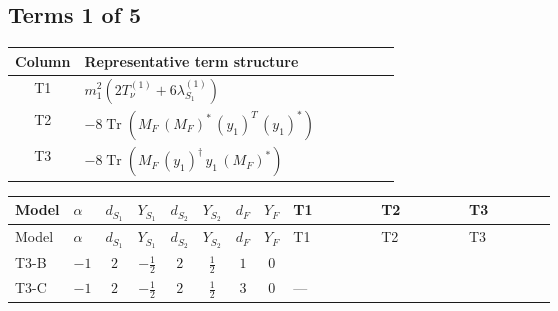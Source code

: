 \documentclass[8pt]{article}
\begin{document}
\begin{landscape}
\subsection*{Terms 1 of 5}
\begin{center}
\begin{tabular}{@{}c >{\raggedright\arraybackslash}p{0.82\linewidth}@{}}
\toprule
Column & Representative term structure \\
\midrule
T1 & \(\displaystyle {m_1^2} (2 T_{\nu}^{(1)}+6 {\lambda_{S_1}^{(1)}})\) \\
\midrule
T2 & \(\displaystyle -8 \operatorname{Tr}\!\left({M_F}\,\left({M_F}\right)^{*}\,\left({y_1}\right)^{T}\,\left({y_1}\right)^{*}\right)\) \\
\midrule
T3 & \(\displaystyle -8 \operatorname{Tr}\!\left({M_F}\,\left({y_1}\right)^{\dagger}\,{y_1}\,\left({M_F}\right)^{*}\right)\) \\
\midrule
\bottomrule
\end{tabular}
\end{center}
\smallskip
\tiny
\begin{longtable}{@{}llcccccc >{\raggedright\arraybackslash}p{0.21\linewidth} >{\raggedright\arraybackslash}p{0.21\linewidth} >{\raggedright\arraybackslash}p{0.21\linewidth}@{}}
\toprule
Model & $\alpha$ & $d_{S_1}$ & $Y_{S_1}$ & $d_{S_2}$ & $Y_{S_2}$ & $d_F$ & $Y_F$ & T1 & T2 & T3 \\
\midrule
\endfirsthead
\toprule
Model & $\alpha$ & $d_{S_1}$ & $Y_{S_1}$ & $d_{S_2}$ & $Y_{S_2}$ & $d_F$ & $Y_F$ & T1 & T2 & T3 \\
\midrule
\endhead
T3-B & $-1$ & $2$ & $-\frac{1}{2}$ & $2$ & $\frac{1}{2}$ & $1$ & $0$ & \scriptsize\adjustbox{max width=\linewidth}{$\begin{gathered} {m_1^2} (2 T_{\nu}^{(1)}+6 {\lambda_{S_1}^{(1)}})\end{gathered}$} & \scriptsize\adjustbox{max width=\linewidth}{$\begin{gathered} -8 \operatorname{Tr}\!\left({M_F}\,\left({M_F}\right)^{*}\,\left({y_1}\right)^{T}\,\left({y_1}\right)^{*}\right)\end{gathered}$} & \scriptsize\adjustbox{max width=\linewidth}{$\begin{gathered} -8 \operatorname{Tr}\!\left({M_F}\,\left({y_1}\right)^{\dagger}\,{y_1}\,\left({M_F}\right)^{*}\right)\end{gathered}$} \\
\midrule
T3-C & $-1$ & $2$ & $-\frac{1}{2}$ & $2$ & $\frac{1}{2}$ & $3$ & $0$ & --- & \scriptsize\adjustbox{max width=\linewidth}{$\begin{gathered} -12 \operatorname{Tr}\!\left({M_F}\,\left({M_F}\right)^{*}\,\left({y_1}\right)^{T}\,\left({y_1}\right)^{*}\right)\end{gathered}$} & \scriptsize\adjustbox{max width=\linewidth}{$\begin{gathered} -12 \operatorname{Tr}\!\left({M_F}\,\left({y_1}\right)^{\dagger}\,{y_1}\,\left({M_F}\right)^{*}\right)\end{gathered}$} \\

\end{longtable}
\end{landscape}
\end{document}
